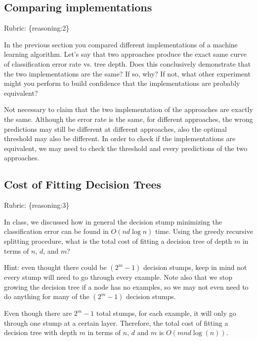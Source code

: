 \documentclass{article}
\def\rubric#1{\gre{Rubric: \{#1\}}}{}
\def\blu#1{{\color{blu}#1}}
\def\gre#1{{\color{gre}#1}}
\def\red#1{{\color{red}#1}}
\begin{document}
\subsection{Comparing implementations}
\rubric{reasoning:2}

In the previous section you compared different implementations of a machine learning algorithm. Let's say that two
approaches produce the exact same curve of classification error rate vs. tree depth. Does this conclusively demonstrate
that the two implementations are the same? If so, why? If not, what other experiment might you perform to build confidence
that the implementations are probably equivalent?

\red{Not necessary to claim that the two implementation of the approaches are exactly the same.
Although the error rate is the same, for different approaches, the wrong predictions may still be different at different approaches, also the optimal threshold may also be different.
In order to check if the implementations are equivalent, we may need to check the threshold and every predictions of the two approaches.
}

\subsection{Cost of Fitting Decision Trees}
\rubric{reasoning:3}

In class, we discussed how in general the decision stump minimizing the classification error can be found in $O(nd\log n)$ time.
Using the greedy recursive splitting procedure, \blu{what is the total cost of fitting a decision tree of depth $m$ in terms of $n$, $d$, and $m$?}

Hint: even thought there could be $(2^m-1)$ decision stumps, keep in mind not every stump will need to go through every example. Note also that we stop growing the decision tree if a node has no examples, so we may not even need to do anything for many of the $(2^m-1)$ decision stumps.

\red{
Even though there are $2^m-1$ total stumps, for each example, it will only go through one stump at a certain layer. Therefore, the total cost of fitting a decision tree with depth $m$ in terms of $n$, $d$ and $m$ is $O(mnd\log(n))$}.
\end{document}
